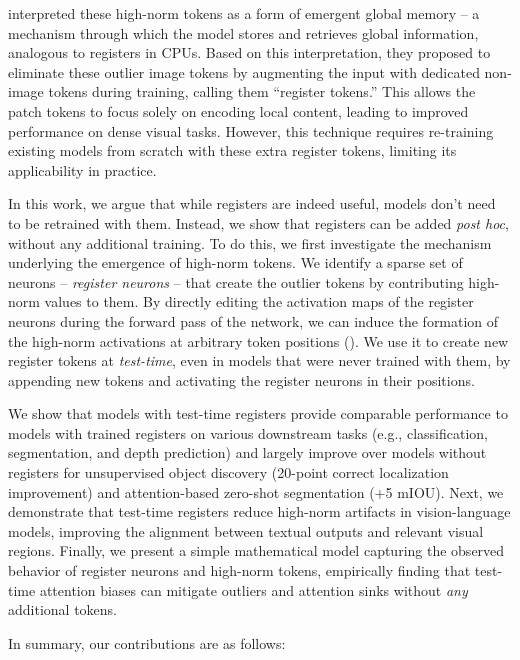 \documentclass{article}
\begin{document}
\cite{darcet2024vision} interpreted these high-norm tokens as a form of emergent global memory -- a mechanism through which the model stores and retrieves global information, analogous to registers in CPUs. Based on this interpretation, they proposed to eliminate these outlier image tokens by augmenting the input with dedicated non-image tokens during training, calling them ``register tokens.'' This allows the patch tokens to focus solely on encoding local content, leading to improved performance on dense visual tasks. 
However, this technique requires re-training existing models from scratch with these extra register tokens, limiting its applicability in practice.

In this work, we argue that while registers are indeed useful, models don't need to be retrained with them. Instead, we show that registers can be added {\em post hoc}, without any additional training. To do this, we first investigate the mechanism underlying the emergence of high-norm tokens. We identify a sparse set of neurons -- \textit{register neurons} -- that create the outlier tokens by contributing high-norm values to them. By directly editing the activation maps of the register neurons during the forward pass of the network, we can induce the formation of the high-norm activations at arbitrary token positions (). We use it to create new register tokens at \textit{test-time}, even in models that were never trained with them,  by appending new tokens and activating the register neurons in their positions. 

We show that models with test-time registers provide comparable performance to models with trained registers on various downstream tasks (e.g., classification, segmentation, and depth prediction) and largely improve over models without registers for unsupervised object discovery (20-point correct localization improvement) and attention-based zero-shot segmentation (+5 mIOU). Next, we demonstrate that test-time registers reduce high-norm artifacts in vision-language models, improving the alignment between textual outputs and relevant visual regions. Finally, we present a simple mathematical model capturing the observed behavior of register neurons and high-norm tokens, empirically finding that test-time attention biases can mitigate outliers and attention sinks without \textit{any} additional tokens.

In summary, our contributions are as follows:
\vspace{-0.7em}
\end{document}
